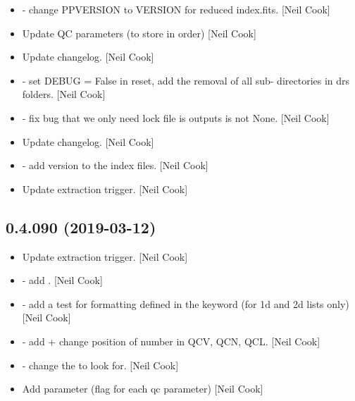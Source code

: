 \documentclass[a4paper,10pt,english]{report}
\begin{document}
\begin{itemize}
\item {} 
 - change PPVERSION to VERSION for reduced index.fits.
{[}Neil Cook{]}

\item {} 
Update QC parameters (to store in order) {[}Neil Cook{]}

\item {} 
Update changelog. {[}Neil Cook{]}

\item {} 
 - set DEBUG = False in reset, add the removal of all sub-
directories in drs folders. {[}Neil Cook{]}

\item {} 
 - fix bug that we only need lock file is outputs is
not None. {[}Neil Cook{]}

\item {} 
Update changelog. {[}Neil Cook{]}

\item {} 
 - add version to the index files. {[}Neil Cook{]}

\item {} 
Update extraction trigger. {[}Neil Cook{]}

\end{itemize}


\subsection{0.4.090 (2019-03-12)}
\label{\detokenize{misc/changelog:id169}}\begin{itemize}
\item {} 
Update extraction trigger. {[}Neil Cook{]}

\item {} 
 - add . {[}Neil Cook{]}

\item {} 
 - add a test for formatting defined in the keyword (for
1d and 2d lists only) {[}Neil Cook{]}

\item {} 
 - add  + change position of number in
QCV, QCN, QCL. {[}Neil Cook{]}

\item {} 
 - change the  to look for. {[}Neil Cook{]}

\item {} 
Add  parameter (flag for each qc parameter) {[}Neil Cook{]}

\end{itemize}
\end{document}
